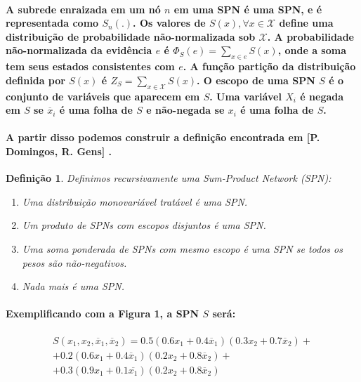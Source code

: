 \documentclass[a4paper,10pt]{article}
\theoremstyle{plain}
\newtheorem*{spn-def}{Definição}
\begin{document}
\paragraph{
  A subrede enraizada em um nó $n$ em uma SPN é uma SPN, e é representada como $S_n(.)$. Os valores
  de $S(x), \forall x \in \mathcal{X}$ define uma distribuição de probabilidade não-normalizada sob
  $\mathcal{X}$. A probabilidade não-normalizada da evidência $e$ é $\Phi_S(e)=\sum_{x \in e}S(x)$,
  onde a soma tem seus estados consistentes com $e$. A função partição da distribuição definida
  por $S(x)$ é $Z_S = \sum_{x \in \mathcal{X}} S(x)$. O escopo\cite{project-def} de uma SPN $S$ é o
  conjunto de variáveis que aparecem em $S$. Uma variável $X_i$ é negada em $S$ se $\overline{x}_i$
  é uma folha de $S$ e não-negada se $x_i$ é uma folha de $S$.
}

\paragraph{
  A partir disso podemos construir a definição encontrada em [P. Domingos, R. Gens]
  \cite{gens-domingos}.
}

\begin{spn-def} Definimos recursivamente uma Sum-Product Network (SPN):
  \begin{enumerate}
    \item Uma distribuição monovariável tratável é uma SPN.
    \item Um produto de SPNs com escopos disjuntos é uma SPN.
    \item Uma soma ponderada de SPNs com mesmo escopo é uma SPN se todos os pesos são não-negativos.
    \item Nada mais é uma SPN.
  \end{enumerate}
\end{spn-def}

\paragraph{
  Exemplificando com a Figura 1, a SPN $S$ será:
}

\begin{equation}
  \begin{split}
    S(x_1,x_2,\overline{x}_1,\overline{x}_2)=0.5(0.6x_1 + 0.4\overline{x}_1)(0.3x_2 + 0.7
    \overline{x}_2) +\\
    + 0.2(0.6x_1 + 0.4\overline{x}_1)(0.2x_2 + 0.8\overline{x}_2) +\\
    + 0.3(0.9x_1 + 0.1\overline{x_1})(0.2x_2 + 0.8\overline{x}_2)\phantom{+}
  \end{split}
\end{equation}
\end{document}
